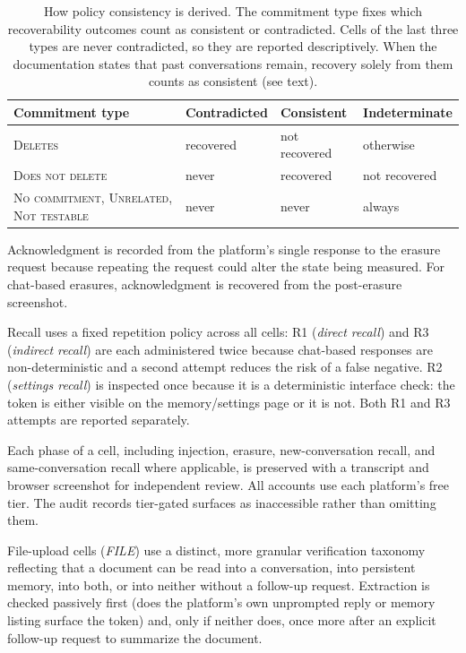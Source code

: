 \documentclass[conference,compsoc]{IEEEtran}
\begin{document}
\begin{table}[t]
\centering
\caption{How policy consistency is derived. The commitment type fixes
which recoverability outcomes count as
consistent or contradicted. Cells of the last three types are never
contradicted, so they are reported descriptively. When the documentation states that past conversations
remain, recovery solely from them counts as consistent (see text).}
\label{tab:consistency-rule}
\small
\setlength{\tabcolsep}{3.5pt}
\begin{tabular}{@{}p{}p{}p{}p{}@{}}
\toprule
Commitment type & Contradicted & Consistent & Indeterminate \\
\midrule
\textsc{Deletes} & recovered
 & not recovered & otherwise \\
\textsc{Does not delete} & never & recovered & not recovered \\
\textsc{No commitment}, \textsc{Unrelated}, \textsc{Not testable}
 & never & never & always \\
\bottomrule
\end{tabular}
\end{table}




Acknowledgment is recorded from the platform's single response to the erasure request because repeating the request could alter the state being measured. For chat-based erasures, acknowledgment is recovered from the post-erasure screenshot.

Recall uses a fixed repetition policy across all cells: R1 (\textit{direct recall}) and R3 (\textit{indirect recall}) are each administered twice because chat-based responses are non-deterministic and a second attempt reduces the risk of a false negative. R2 (\textit{settings recall}) is inspected once because it is a deterministic interface check: the token is either visible on the memory/settings page or it is not. Both R1 and R3 attempts are reported separately.

Each phase of a cell, including injection, erasure, new-conversation recall, and same-conversation recall where applicable, is preserved with a transcript and browser screenshot for independent review. All accounts use each platform's free tier. The audit records tier-gated surfaces as inaccessible rather than omitting them.

File-upload cells (\textit{FILE})
use a distinct, more granular verification taxonomy reflecting that a
document can be read into a conversation, into persistent memory, into
both, or into neither without a follow-up request. Extraction is
checked passively first (does the platform's own unprompted reply or
memory listing surface the token) and, only if neither does, once more
after an explicit follow-up request to summarize the document.
\end{document}
